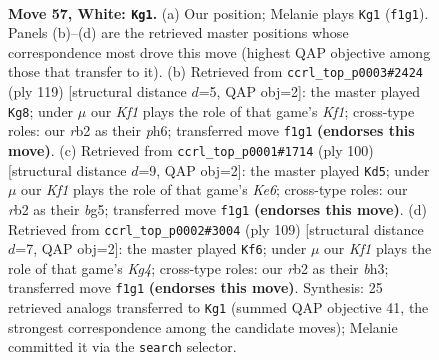 \documentclass[11pt]{article}
\begin{document}
\clearpage

\begin{figure}[p]\centering
\begin{subfigure}{0.46\textwidth}\centering
\resizebox{\linewidth}{!}{%
\newchessgame
\chessboard[
  setfen={5k2/8/8/4p1p1/5p2/5B2/1r6/5K2 w - - 25 57},
  showmover=false,
  pgfstyle=straightmove, color=movearrow, markmove={f1-g1}
]}
\caption{}
\end{subfigure}\hfill
\begin{subfigure}{0.46\textwidth}\centering
\resizebox{\linewidth}{!}{%
\newchessgame
\chessboard[
  setfen={5k2/8/4K2P/6P1/5P2/8/1b6/8 b - - 0 60},
  showmover=false,
  pgfstyle=straightmove, color=movearrow, markmove={f8-g8}
]}
\caption{}
\end{subfigure}
\\[4pt]
\begin{subfigure}{0.46\textwidth}\centering
\resizebox{\linewidth}{!}{%
\newchessgame
\chessboard[
  setfen={8/7k/4K3/1p4b1/2pB4/8/8/8 w - - 6 51},
  showmover=false,
  pgfstyle=straightmove, color=movearrow, markmove={e6-d5}
]}
\caption{}
\end{subfigure}\hfill
\begin{subfigure}{0.46\textwidth}\centering
\resizebox{\linewidth}{!}{%
\newchessgame
\chessboard[
  setfen={8/8/1b1p4/1P1P2k1/2P5/5K1B/8/8 b - - 0 55},
  showmover=false,
  pgfstyle=straightmove, color=movearrow, markmove={g5-f6}
]}
\caption{}
\end{subfigure}
\caption{\textbf{Move 57, White: \texttt{Kg1}.} (a) Our position; Melanie plays \texttt{Kg1} (\texttt{f1g1}). Panels (b)--(d) are the retrieved master positions whose correspondence most drove this move (highest QAP objective among those that transfer to it). (b) Retrieved from \texttt{ccrl\_top\_p0003\#2424} (ply 119) [structural distance $d$=5, QAP obj=2]: the master played \texttt{Kg8}; under $\mu$ our \emph{Kf1} plays the role of that game's \emph{Kf1}; cross-type roles: our \emph{r}b2 as their \emph{p}h6; transferred move \texttt{f1g1} \textbf{(endorses this move)}. (c) Retrieved from \texttt{ccrl\_top\_p0001\#1714} (ply 100) [structural distance $d$=9, QAP obj=2]: the master played \texttt{Kd5}; under $\mu$ our \emph{Kf1} plays the role of that game's \emph{Ke6}; cross-type roles: our \emph{r}b2 as their \emph{b}g5; transferred move \texttt{f1g1} \textbf{(endorses this move)}. (d) Retrieved from \texttt{ccrl\_top\_p0002\#3004} (ply 109) [structural distance $d$=7, QAP obj=2]: the master played \texttt{Kf6}; under $\mu$ our \emph{Kf1} plays the role of that game's \emph{Kg4}; cross-type roles: our \emph{r}b2 as their \emph{b}h3; transferred move \texttt{f1g1} \textbf{(endorses this move)}. Synthesis: 25 retrieved analogs transferred to \texttt{Kg1} (summed QAP objective 41, the strongest correspondence among the candidate moves); Melanie committed it via the \texttt{search} selector.}
\label{fig:thought-m112}
\end{figure}
\end{document}
